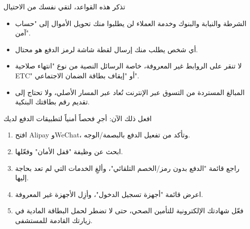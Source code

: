 \begin{tcbwarn}{تذكر هذه القواعد، لتقي نفسك من الاحتيال}
\begin{itemize}
  \item الشرطة والنيابة والبنوك وخدمة العملاء لن يطلبوا منك تحويل الأموال إلى "حساب آمن".
  \item أي شخص يطلب منك إرسال لقطة شاشة لرمز الدفع هو محتال.
  \item لا تنقر على الروابط غير المعروفة، خاصة الرسائل النصية من نوع "انتهاء صلاحية ETC" أو "إيقاف بطاقة الضمان الاجتماعي".
  \item المبالغ المستردة من التسوق عبر الإنترنت تُعاد عبر المسار الأصلي، ولا تحتاج إلى تقديم رقم بطاقتك البنكية.
\end{itemize}

\end{tcbwarn}

\begin{tcbpractice}{افعل ذلك الآن: أجرِ فحصاً أمنياً لتطبيقات الدفع لديك}
\begin{enumerate}
  \item افتح Alipay وWeChat، وتأكد من تفعيل الدفع بالبصمة/الوجه.
  \item ابحث عن وظيفة "قفل الأمان" وفعّلها.
  \item راجع قائمة "الدفع بدون رمز/الخصم التلقائي"، وألغِ الخدمات التي لم تعد بحاجة إليها.
  \item اعرض قائمة "أجهزة تسجيل الدخول"، وأزِل الأجهزة غير المعروفة.
  \item فعّل شهادتك الإلكترونية للتأمين الصحي، حتى لا تضطر لحمل البطاقة المادية في زيارتك القادمة للمستشفى.
\end{enumerate}

\end{tcbpractice}
